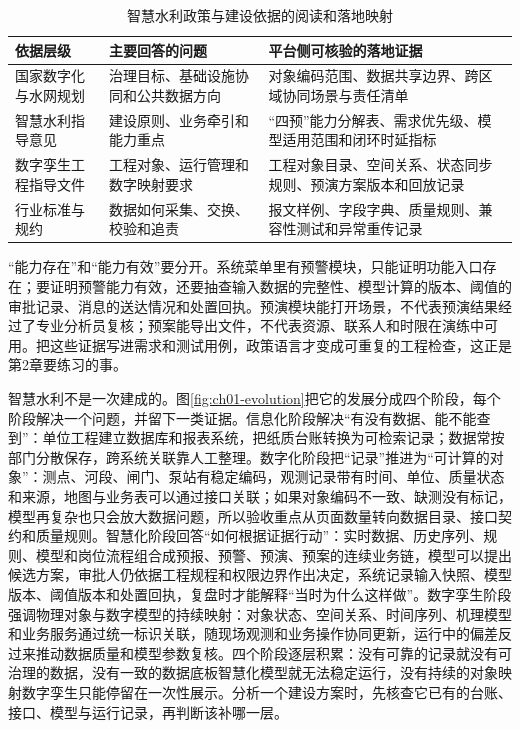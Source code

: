 \begin{table}[htbp]
\centering
\caption{智慧水利政策与建设依据的阅读和落地映射}
\label{tab:ch01-policy-map}
\begin{tabular}{p{3.0cm}p{4.6cm}p{6.2cm}}
\toprule
依据层级 & 主要回答的问题 & 平台侧可核验的落地证据 \\
\midrule
国家数字化与水网规划 & 治理目标、基础设施协同和公共数据方向 & 对象编码范围、数据共享边界、跨区域协同场景与责任清单\cite{digitalChina2023,nationalWaterNetwork2023} \\
智慧水利指导意见 & 建设原则、业务牵引和能力重点 & “四预”能力分解表、需求优先级、模型适用范围和闭环时延指标\cite{smartWaterGuidance2021} \\
数字孪生工程指导文件 & 工程对象、运行管理和数字映射要求 & 工程对象目录、空间关系、状态同步规则、预演方案版本和回放记录\cite{twinProject2024} \\
行业标准与规约 & 数据如何采集、交换、校验和追责 & 报文样例、字段字典、质量规则、兼容性测试和异常重传记录\cite{slt6512014} \\
\bottomrule
\end{tabular}
\end{table}

“能力存在”和“能力有效”要分开。系统菜单里有预警模块，只能证明功能入口存在；要证明预警能力有效，还要抽查输入数据的完整性、模型计算的版本、阈值的审批记录、消息的送达情况和处置回执。预演模块能打开场景，不代表预演结果经过了专业分析员复核；预案能导出文件，不代表资源、联系人和时限在演练中可用。把这些证据写进需求和测试用例，政策语言才变成可重复的工程检查，这正是第2章要练习的事。

智慧水利不是一次建成的。图\ref{fig:ch01-evolution}把它的发展分成四个阶段，每个阶段解决一个问题，并留下一类证据。信息化阶段解决“有没有数据、能不能查到”：单位工程建立数据库和报表系统，把纸质台账转换为可检索记录；数据常按部门分散保存，跨系统关联靠人工整理。数字化阶段把“记录”推进为“可计算的对象”：测点、河段、闸门、泵站有稳定编码，观测记录带有时间、单位、质量状态和来源，地图与业务表可以通过接口关联；如果对象编码不一致、缺测没有标记，模型再复杂也只会放大数据问题，所以验收重点从页面数量转向数据目录、接口契约和质量规则。智慧化阶段回答“如何根据证据行动”：实时数据、历史序列、规则、模型和岗位流程组合成预报、预警、预演、预案的连续业务链，模型可以提出候选方案，审批人仍依据工程规程和权限边界作出决定，系统记录输入快照、模型版本、阈值版本和处置回执，复盘时才能解释“当时为什么这样做”。数字孪生阶段强调物理对象与数字模型的持续映射：对象状态、空间关系、时间序列、机理模型和业务服务通过统一标识关联，随现场观测和业务操作协同更新，运行中的偏差反过来推动数据质量和模型参数复核\cite{twinWater2023,twinProject2024}。四个阶段逐层积累：没有可靠的记录就没有可治理的数据，没有一致的数据底板智慧化模型就无法稳定运行，没有持续的对象映射数字孪生只能停留在一次性展示。分析一个建设方案时，先核查它已有的台账、接口、模型与运行记录，再判断该补哪一层。

